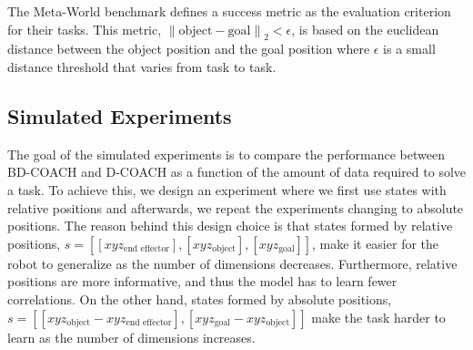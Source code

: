 The Meta-World benchmark defines a success metric as the evaluation criterion for their tasks. This metric, ${\left\lVert \text{object}-\text{goal} \right\rVert}_2 < \epsilon$, is based on the euclidean distance between the object position and the goal position where $\epsilon$ is a small distance threshold that varies from task to task.





\subsection{Simulated Experiments}
\label{subsection:simulated-experiments}




The goal of the simulated experiments is to compare the performance between BD-COACH and D-COACH as a function of the amount of data required to solve a task. To achieve this, we design an experiment where we first use states with relative positions and afterwards, we repeat the experiments changing to absolute positions. The reason behind this design choice is that states formed by relative positions, $ s= [[xyz_\text{end effector}], [xyz_\text{object}], [xyz_\text{goal}]]$, make it easier for the robot to generalize as the number of dimensions decreases. Furthermore, relative positions are more informative, and thus the model has to learn fewer correlations. On the other hand, states formed by absolute positions, $s = [[xyz_\text{object} - xyz_\text{end effector}], [xyz_\text{goal} - xyz_\text{object}]]$ make the task harder to learn as the number of dimensions increases.  

